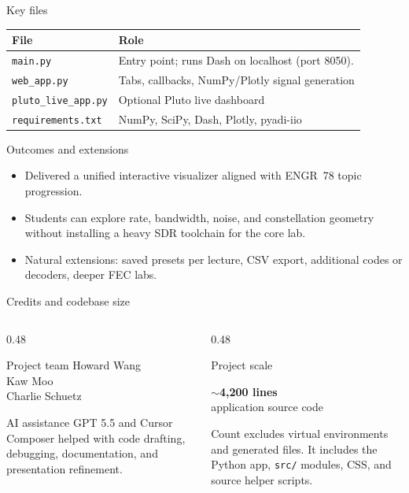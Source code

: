 \documentclass[aspectratio=169, 12pt]{beamer}
\begin{document}
\begin{frame}{Key files}
\centering
\footnotesize
\begin{tabular}{@{}ll@{}}
\toprule
\textbf{File} & \textbf{Role} \\
\midrule
\texttt{main.py} & Entry point; runs Dash on localhost (port 8050). \\
\texttt{web\_app.py} & Tabs, callbacks, NumPy/Plotly signal generation \\
\texttt{pluto\_live\_app.py} & Optional Pluto live dashboard \\
\texttt{requirements.txt} & NumPy, SciPy, Dash, Plotly, pyadi-iio \\
\bottomrule
\end{tabular}
\end{frame}

\begin{frame}{Outcomes and extensions}
\begin{itemize}
    \item Delivered a \alert{unified} interactive visualizer aligned with ENGR~78 topic progression.
    \item Students can explore rate, bandwidth, noise, and constellation geometry without installing a heavy SDR toolchain for the core lab.
    \item Natural extensions: saved presets per lecture, CSV export, additional codes or decoders, deeper FEC labs.
\end{itemize}
\end{frame}

\begin{frame}{Credits and codebase size}
\small
\begin{columns}[T,onlytextwidth]
\begin{column}{0.48\linewidth}
\begin{block}{Project team}
Howard Wang\\
Kaw Moo\\
Charlie Schuetz
\end{block}
\begin{block}{AI assistance}
GPT 5.5 and Cursor Composer helped with code drafting, debugging, documentation, and presentation refinement.
\end{block}
\end{column}
\begin{column}{0.48\linewidth}
\begin{block}{Project scale}
\begin{center}
{\LARGE\bfseries $\sim$4,200 lines}\\[0.08cm]
{\normalsize application source code}
\end{center}
\end{block}
{\scriptsize\color{SlideMuted}Count excludes virtual environments and generated files. It includes the Python app, \texttt{src/} modules, CSS, and source helper scripts.\par}
\end{column}
\end{columns}
\end{frame}
\end{document}
